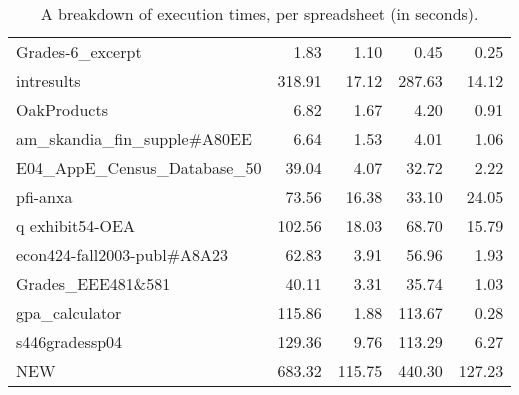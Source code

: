 \begin{table}[!t]
\begin{tabular}{l|r|rrr}
\small{Grades-6\_excerpt} & \small{1.83} & \small{1.10} & \small{0.45} & \small{0.25} \\ 
\small{intresults} & \small{318.91} & \small{17.12} & \small{287.63} & \small{14.12} \\ 
\small{OakProducts} & \small{6.82} & \small{1.67} & \small{4.20} & \small{0.91} \\ 
\small{am\_skandia\_fin\_supple\#A80EE} & \small{6.64} & \small{1.53} & \small{4.01} & \small{1.06} \\ 
\small{E04\_AppE\_Census\_Database\_50} & \small{39.04} & \small{4.07} & \small{32.72} & \small{2.22} \\ 
\small{pfi-anxa} & \small{73.56} & \small{16.38} & \small{33.10} & \small{24.05} \\ 
\small{q exhibit54-OEA} & \small{102.56} & \small{18.03} & \small{68.70} & \small{15.79} \\ 
\small{econ424-fall2003-publ\#A8A23} & \small{62.83} & \small{3.91} & \small{56.96} & \small{1.93} \\ 
\small{Grades\_EEE481\&581} & \small{40.11} & \small{3.31} & \small{35.74} & \small{1.03} \\ 
\small{gpa\_calculator} & \small{115.86} & \small{1.88} & \small{113.67} & \small{0.28} \\ 
\small{s446gradessp04} & \small{129.36} & \small{9.76} & \small{113.29} & \small{6.27} \\ 
\small{NEW} & \small{683.32} & \small{115.75} & \small{440.30} & \small{127.23} \\ 
    \end{tabular}%
  \caption{A breakdown of \checkcell{} execution times, per spreadsheet (in seconds).\label{tab:spreadsheet_breakdown}}
\end{table}


